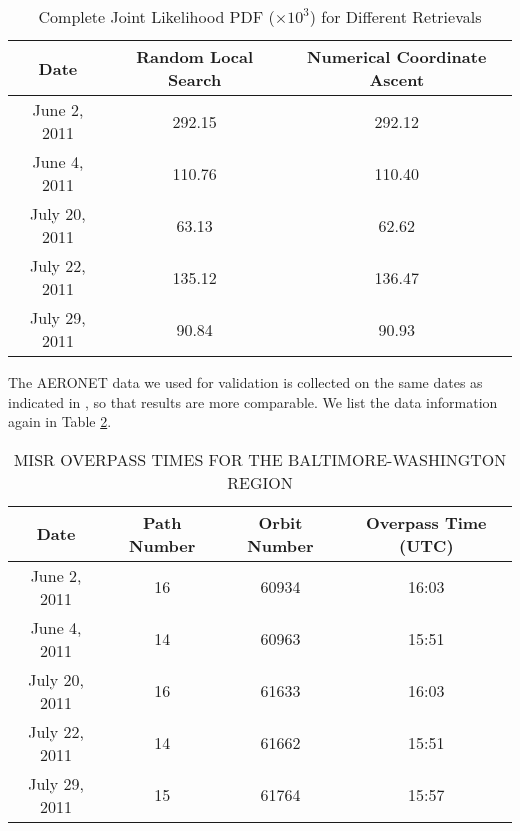 \begin{table}[h!]
    \centering
    \caption{Complete Joint Likelihood PDF ($\times 10^3$) for Different Retrievals}
    \label{tab:post_lik}
    \begin{tabular}{|c|c|c|}
        \hline
        Date & Random Local Search & Numerical Coordinate Ascent\\
        \hline
        June 2, 2011 & 292.15 & 292.12 \\
        June 4, 2011& 110.76 & 110.40 \\
        July 20, 2011 & 63.13 & 62.62 \\
        July 22, 2011 & 135.12 & 136.47 \\
        July 29, 2011 & 90.84 & 90.93 \\
        \hline
    \end{tabular}
\end{table}

The AERONET data we used for validation is collected on the same dates as indicated in \cite{taesup}, so that results are more comparable. We list the data information again in Table \ref{tab:aeronet_data}.

\begin{table}[h!]
    \begin{center}
        \caption{MISR OVERPASS TIMES FOR THE BALTIMORE-WASHINGTON REGION}
        \label{tab:aeronet_data}
        \begin{tabular}{c|c|c|c}
            \hline
            \textbf{Date}  & \textbf{Path Number} & \textbf{Orbit Number} & \textbf{Overpass Time (UTC)}\\
            \hline
            \hline
            June 2, 2011 & 16 & 60934 & 16:03\\
            June 4, 2011 & 14 & 60963 & 15:51\\
            July 20, 2011 & 16 & 61633 & 16:03\\
            July 22, 2011 & 14 & 61662 & 15:51\\
            July 29, 2011 & 15 & 61764 & 15:57\\
            \hline
        \end{tabular}
    \end{center}
\end{table}

